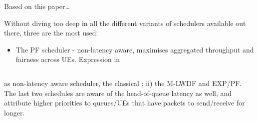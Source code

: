 \label{ap:d}

Based on this paper\dots

Without diving too deep in all the different variants of schedulers available out there, three are the most used:
\begin{itemize}
    \item The \ac{PF} scheduler - non-latency aware, maximises aggregated throughput and fairness across UEs. Expression in 
    
    \begin{equation} \label{eq:pf}
        
    \end{equation}
\end{itemize}


as non-latency aware scheduler, the classical  ; ii) the \ac{M-LWDF} and \ac{EXP/PF}. The last two schedules are aware of the head-of-queue latency as well, and attribute higher priorities to queues/UEs that have packets to send/receive for longer. 
    
